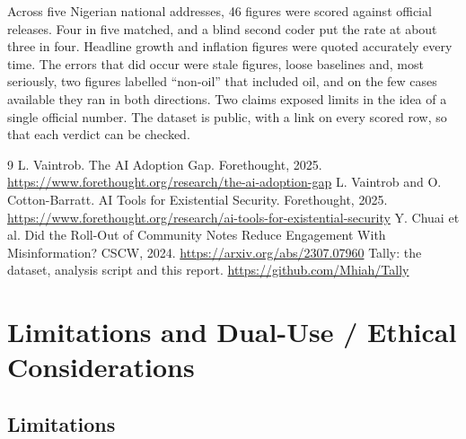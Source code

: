 \documentclass[11pt]{article}
\begin{document}
Across five Nigerian national addresses, 46 figures were scored against official releases. Four in five matched, and a blind second coder put the rate at about three in four. Headline growth and inflation figures were quoted accurately every time. The errors that did occur were stale figures, loose baselines and, most seriously, two figures labelled ``non-oil'' that included oil, and on the few cases available they ran in both directions. Two claims exposed limits in the idea of a single official number. The dataset is public, with a link on every scored row, so that each verdict can be checked.

\begin{thebibliography}{9}\small
{} L. Vaintrob. The AI Adoption Gap. Forethought, 2025. \url{https://www.forethought.org/research/the-ai-adoption-gap}
 L. Vaintrob and O. Cotton-Barratt. AI Tools for Existential Security. Forethought, 2025. \url{https://www.forethought.org/research/ai-tools-for-existential-security}
 Y. Chuai et al. Did the Roll-Out of Community Notes Reduce Engagement With Misinformation? CSCW, 2024. \url{https://arxiv.org/abs/2307.07960}
 Tally: the dataset, analysis script and this report. \url{https://github.com/Mhiah/Tally}
\end{thebibliography}

\appendix

\section{Limitations and Dual-Use / Ethical Considerations}
\label{sec:limits}

\subsection*{Limitations}
\end{document}
